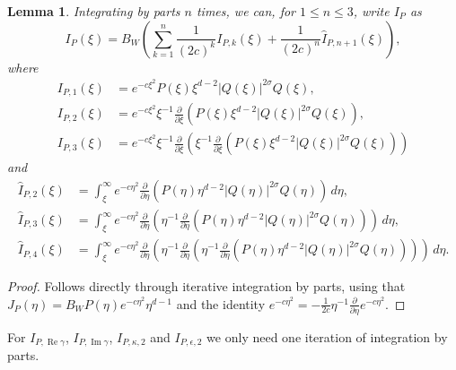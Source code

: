 \documentclass[11pt]{article}
\DeclareMathOperator{\real}{Re}
\DeclareMathOperator{\imag}{Im}
\newtheorem{lemma}[definition]{Lemma}
\begin{document}
\begin{lemma}\label{lemma:I_P-expansion}
  Integrating by parts \(n\) times, we can, for \(1 \leq n \leq 3\),
  write \(I_P\) as
  \begin{equation}
    \label{eq:I_P-expansion}
    I_{P}(\xi) =
    B_{W}\left(
      \sum_{k = 1}^{n} \frac{1}{(2c)^{k}} I_{P,k}(\xi)
      + \frac{1}{(2c)^{n}}\hat{I}_{P,n + 1}(\xi)
    \right),
  \end{equation}
  where
  \begin{align*}
    I_{P,1}(\xi)
    &= e^{-c\xi^{2}}P(\xi)\xi^{d - 2}|Q(\xi)|^{2\sigma}Q(\xi),\\
    I_{P,2}(\xi)
    &= e^{-c\xi^{2}}\xi^{-1}
      \frac{\partial}{\partial \xi}\left(P(\xi)\xi^{d - 2}|Q(\xi)|^{2\sigma}Q(\xi)\right),\\
    I_{P,3}(\xi)
    &= e^{-c\xi^{2}}\xi^{-1}
      \frac{\partial}{\partial \xi}\left(\xi^{-1}\frac{\partial}{\partial \xi}\left(P(\xi)\xi^{d - 2}|Q(\xi)|^{2\sigma}Q(\xi)\right)\right)
  \end{align*}
  and
  \begin{align*}
    \hat{I}_{P,2}(\xi)
    &= \int_{\xi}^{\infty}e^{-c\eta^{2}}
      \frac{\partial}{\partial \eta}\left(P(\eta)\eta^{d - 2}|Q(\eta)|^{2\sigma}Q(\eta)\right)\,d\eta,\\
    \hat{I}_{P,3}(\xi)
    &= \int_{\xi}^{\infty}
      e^{-c\eta^{2}}\frac{\partial}{\partial \eta}\left(
      \eta^{-1}
      \frac{\partial}{\partial \eta}\left(P(\eta)\eta^{d - 2}|Q(\eta)|^{2\sigma}Q(\eta)\right)
      \right)\,d\eta,\\
    \hat{I}_{P,4}(\xi)
    &= \int_{\xi}^{\infty}
      e^{-c\eta^{2}}\frac{\partial}{\partial \eta}\left(
      \eta^{-1}
      \frac{\partial}{\partial \eta}\left(
      \eta^{-1}
      \frac{\partial}{\partial \eta}\left(P(\eta)\eta^{d - 2}|Q(\eta)|^{2\sigma}Q(\eta)\right)
      \right)\right)\,d\eta.
  \end{align*}
\end{lemma}

\begin{proof}
  Follows directly through iterative integration by parts, using that
  \(J_{P}(\eta) = B_{W}P(\eta)e^{-c\eta^{2}}\eta^{d - 1}\) and the
  identity
  \(e^{-c\eta^{2}} = -\frac{1}{2c}\eta^{-1}\frac{\partial}{\partial
    \eta} e^{-c\eta^{2}}\).
\end{proof}

For \(I_{P,\real\gamma}\), \(I_{P,\imag\gamma}\), \(I_{P,\kappa,2}\)
and \(I_{P,\epsilon,2}\) we only need one iteration of integration by
parts.
\end{document}
